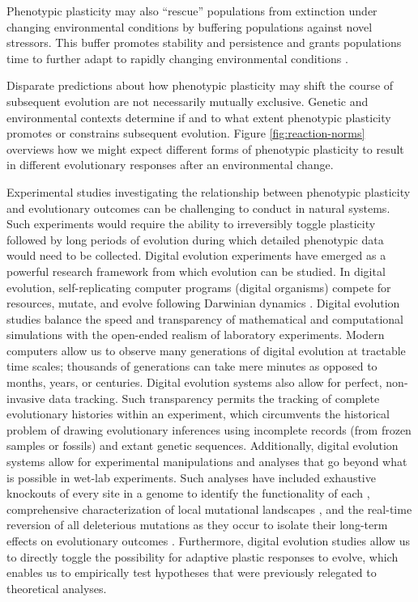 Phenotypic plasticity may also ``rescue'' populations from extinction under changing environmental conditions by buffering populations against novel stressors.
This buffer promotes stability and persistence and grants populations time to further adapt to rapidly changing environmental conditions \citep{west-eberhard_developmental_2003,chevin_when_2010}. 

Disparate predictions about how phenotypic plasticity may shift the course of subsequent evolution are not necessarily mutually exclusive.
Genetic and environmental contexts determine if and to what extent phenotypic plasticity promotes or constrains subsequent evolution.
Figure \ref{fig:reaction-norms} overviews how we might expect different forms of phenotypic plasticity to result in different evolutionary responses after an environmental change.

Experimental studies investigating the relationship between phenotypic plasticity and evolutionary outcomes can be challenging to conduct in natural systems.
Such experiments would require the ability to irreversibly toggle plasticity followed by long periods of evolution during which detailed phenotypic data would need to be collected.
Digital evolution experiments have emerged as a powerful research framework from which evolution can be studied.
In digital evolution, self-replicating computer programs (digital organisms) compete for resources, mutate, and evolve following Darwinian dynamics  \citep{wilke_biology_2002}.
Digital evolution studies balance the speed and transparency of mathematical and computational simulations with the open-ended realism of laboratory experiments.
Modern computers allow us to observe many generations of digital evolution at tractable time scales; thousands of generations can take mere minutes as opposed to months, years, or centuries.
Digital evolution systems also allow for perfect, non-invasive data tracking.
Such transparency permits the tracking of complete evolutionary histories within an experiment, which circumvents the historical problem of drawing evolutionary inferences using incomplete records (from frozen samples or fossils) and extant genetic sequences.
Additionally, digital evolution systems allow for experimental manipulations and analyses that go beyond what is possible in wet-lab experiments.
Such analyses have included exhaustive knockouts of every site in a genome to identify the functionality of each \citep{lenski_evolutionary_2003},
comprehensive characterization of local mutational landscapes \citep{lenski_genome_1999,canino-koning_fluctuating_2019},
and the real-time reversion of all deleterious mutations as they occur to isolate their long-term effects on evolutionary outcomes \citep{covert_experiments_2013}. 
Furthermore, digital evolution studies allow us to directly toggle the possibility for adaptive plastic responses to evolve, which enables us to empirically test hypotheses that were previously relegated to theoretical analyses.


